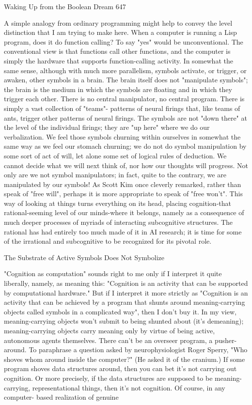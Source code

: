 Waking Up from the Boolean Dream                                                         647

        A simple analogy from ordinary programming might help to convey the level
distinction that I am trying to make here. When a computer is running a Lisp program,
does it do function calling? To say "yes" would be unconventional. The conventional
view is that functions call other functions, and the computer is simply the hardware
that supports function-calling activity. In somewhat the same sense, although with
much more parallelism, symbols activate, or trigger, or awaken, other symbols in a
brain.
        The brain itself does not "manipulate symbols"; the brain is the medium in
which the symbols are floating and in which they trigger each other. There is no
central manipulator, no central program. There is simply a vast collection of "teams"-
patterns of neural firings that, like teams of ants, trigger other patterns of neural
firings. The symbols are not "down there" at the level of the individual firings; they
are "up here" where we do our verbalization. We feel those symbols churning within
ourselves in somewhat the same way as we feel our stomach churning; we do not do
symbol manipulation by some sort of act of will, let alone some set of logical rules of
deduction. We cannot decide what we will next think of, nor how our thoughts will
progress.
        Not only are we not symbol manipulators; in fact, quite to the contrary, we are
manipulated by our symbols! As Scott Kim once cleverly remarked, rather than speak
of "free will", perhaps it is more appropriate to speak of "free won't". This way of
looking at things turns everything on its head, placing cognition-that rational-seeming
level of our minds-where it belongs, namely as a consequence of much deeper
processes of myriads of interacting subcognitive structures. The rational has had
entirely too much made of it in AI research; it is time for some of the irrational and
subcognitive to be recognized for its pivotal role.

               The Substrate of Active Symbols Does Not Symbolize

        "Cognition as computation" sounds right to me only if I interpret it quite
liberally, namely, as meaning this: "Cognition is an activity that can be supported by
computational hardware." But if I interpret it more strictly as "Cognition is an activity
that can be achieved by a program that shunts around meaning-carrying objects called
symbols in a complicated way", then I don't buy it. In my view, meaning-carrying
objects won't submit to being shunted about (it's demeaning); meaning-carrying
objects carry meaning only by virtue of being active, autonomous agents themselves.
There can't be an overseer program, a pusher-around.
        To paraphrase a question asked by neurophysiologist Roger Sperry, "Who
shoves whom around inside the computer?" (He asked it of the cranium.) If some
program shoves data structures around, then you can bet it's not carrying out
cognition. Or more precisely, if the data structures are supposed to be meaning-
carrying, representational things, then it's not cognition. Of course, in any computer-
based realization of genuine




